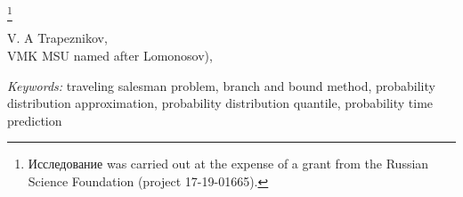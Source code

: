 \documentclass[12pt]{article}
\begin{document}
 \newcommand{\N}{{\textnumero}} 
 
 \thanks{Исследование was carried out at the expense of a grant from the Russian Science Foundation (project {\textnumero} 17-19-01665).} 
 
 V. A
 Trapeznikov, \\VMK MSU named after
 Lomonosov), \\ 
 
 \maketitle 
 
 \begin{abstract} 
 Results of a comparative statistical analysis of the time for solving the asymmetric traveling salesman problem (NTSP) by the branch and bound method (without precomputing the tour) and the combined method
 The combined method consists of the approximate Lin-Kernighan-Helsgaun algorithm used to calculate the initial tour, and the branch and bound method
 It is shown that the use of an approximate solution found using the Lin-Kernighan-Helsgaun algorithm can significantly reduce the search time for an exact solution to the traveling salesman problem by the branch and boundary method for problems from a certain class
A forecast of the search time for an exact solution by the branch and boundary method and the combined algorithm
A computational experiment has shown that the proportion of problems that were solved faster by the combined algorithm than by the branch and boundary method increases with the problem dimension

 \end{abstract} 
 {\it Keywords:} traveling salesman problem, branch and bound method, probability distribution approximation, probability distribution quantile, probability time prediction
 
\end{document}
